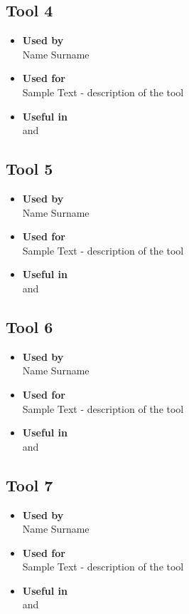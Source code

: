 \subsection*{Tool 4}
\begin{itemize}
	\item \textbf{Used by}\\ Name Surname
	\item \textbf{Used for}\\ Sample Text - description of the tool
	\item \textbf{Useful in}\\  and 
\end{itemize}

\subsection*{Tool 5}
\begin{itemize}
	\item \textbf{Used by}\\ Name Surname
	\item \textbf{Used for}\\ Sample Text - description of the tool
	\item \textbf{Useful in}\\  and 
\end{itemize}

\subsection*{Tool 6}
\begin{itemize}
	\item \textbf{Used by}\\ Name Surname
	\item \textbf{Used for}\\ Sample Text - description of the tool
	\item \textbf{Useful in}\\  and 
\end{itemize}

\subsection*{Tool 7}
\begin{itemize}
	\item \textbf{Used by}\\ Name Surname
	\item \textbf{Used for}\\ Sample Text - description of the tool
	\item \textbf{Useful in}\\  and 
\end{itemize}

